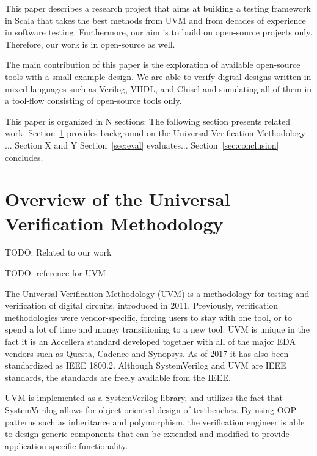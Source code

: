 \documentclass[conference]{IEEEtran}
\newcommand{\todo}[1]{{\color{olive} TODO: #1}}
\begin{document}
This paper describes a research project that aims at building a testing framework
in Scala that takes the best methods from UVM and from decades of experience
in software testing.
Furthermore, our aim is to build on open-source projects only. Therefore, our
work is in open-source as well.

The main contribution of this paper is the exploration of available open-source tools
with a small example design. We are able to verify digital designs written in mixed
languages such as Verilog, VHDL, and Chisel and simulating all of them in a tool-flow
consisting of open-source tools only.

This paper is organized in N sections: The following section presents related work.
Section~\ref{sec:related} provides background on the Universal Verification Methodology ...
Section X and Y 
Section~\ref{sec:eval} evaluates...
Section~\ref{sec:conclusion} concludes.


\section{Overview of the Universal Verification Methodology}
\label{sec:related}


\todo{Related to our work}

\todo{reference for UVM}

The Universal Verification Methodology (UVM) is a methodology for testing and verification of digital circuits, introduced in 2011. Previously, verification methodologies were vendor-specific, forcing users to stay with one tool, or to spend a lot of time and money transitioning to a new tool. UVM is unique in the fact it is an Accellera standard developed together with all of the major EDA vendors such as Questa, Cadence and Synopsys. As of 2017 it has also been standardized as IEEE 1800.2. Although SystemVerilog and UVM are IEEE standards, the standards are freely available from the IEEE.

UVM is implemented as a SystemVerilog library, and utilizes the fact that SystemVerilog allows for object-oriented design of testbenches. By using OOP patterns such as inheritance and polymorphism, the verification engineer is able to design generic components that can be extended and modified to provide application-specific functionality. 
\end{document}
